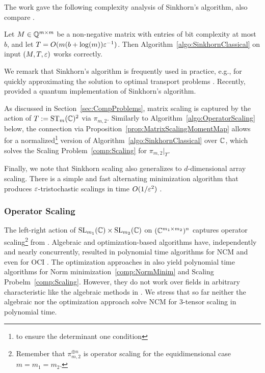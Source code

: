 The work \cite{linial2000deterministic} gave the following complexity analysis of Sinkhorn's algorithm, also compare \cite[Theorem~2.6]{gargOliveira2018Survey}.

\begin{theorem}
	Let $M \in \mathbb Q^{m \times m}$ be a non-negative matrix with entries of bit complexity at most $b$, and let $T = O(m(b + \log(m))\varepsilon^{-1})$. Then Algorithm~\ref{algo:SinkhornClassical} on input $(M, T, \varepsilon)$ works correctly.
\end{theorem}

We remark that Sinkhorn's algorithm is frequently used in practice, e.g., for quickly approximating the solution to optimal transport problems \cite{cuturi2013sinkhorn}.
Recently, \cite{haroldEtAL2021Quantum} provided a quantum implementation of Sinkhorn's algorithm.

As discussed in Section~\ref{sec:CompProblems}, matrix scaling is captured by the action of $T := \operatorname{ST}_m(\mathbb C)^2$ via $\pi_{m,2}$. Similarly to Algorithm~\ref{algo:OperatorScaling} below, the connection via Proposition~\ref{prop:MatrixScalingMomentMap} allows for a normalized\footnote{to ensure the determinant one condition}
version of Algorithm~\ref{algo:SinkhornClassical} over $\mathbb C$, which solves the Scaling Problem~\ref{comp:Scaling} for $\pi_{m,2} |_{T}$.

Finally, we note that Sinkhorn scaling also generalizes to $d$-dimensional array scaling. There is a simple and fast alternating minimization algorithm that produces $\varepsilon$-tristochastic scalings in time $O(1/\varepsilon^2)$ \cite{altschuler2022polynomial,lin2022complexity}.

\subsubsection*{Operator Scaling}

The left-right action of $\operatorname{SL}_{m_1}(\mathbb C) \times \operatorname{SL}_{m_2}(\mathbb C)$ on $(\mathbb C^{m_1 \times m_2})^n$ captures operator scaling\footnote{Remember that $\pi_{m,2}^{\oplus n}$ is operator scaling for the equidimensional case $m = m_1 = m_2$.}
from \cite{gurvits2004classical}.
Algebraic and optimization-based algorithms have, independently and nearly concurrently, resulted in polynomial time algorithms for NCM \cite{garg2016deterministic, ivanyos2017constructive} and even for OCI \cite{allen2018operator, derksen2018algorithms}. The optimization approaches in \cite{garg2016deterministic, allen2018operator} also yield polynomial time algorithms for Norm minimization~\ref{comp:NormMinim} and Scaling Probelm~\ref{comp:Scaling}. However, they do not work over fields in arbitrary characteristic like the algebraic methods in \cite{ivanyos2017constructive, derksen2018algorithms}.
We stress that so far neither the algebraic nor the optimization approach solve NCM for $3$-tensor scaling in polynomial time.

